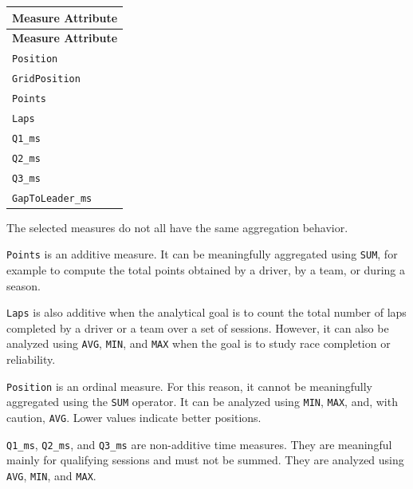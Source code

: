\documentclass[a4paper,11pt]{article}
\begin{document}
	\begin{longtable}{|p{8cm}|}
		\hline
		\textbf{Measure Attribute} \\
		\hline
		\endfirsthead
		
		\hline
		\textbf{Measure Attribute} \\
		\hline
		\endhead
		
		\texttt{Position} \\
		\hline

		\texttt{GridPosition} \\
		\hline
		
		\texttt{Points} \\
		\hline
		
		\texttt{Laps} \\
		\hline
		
		\texttt{Q1\_ms} \\
		\hline
		
		\texttt{Q2\_ms} \\
		\hline
		
		\texttt{Q3\_ms} \\
		\hline
		
		\texttt{GapToLeader\_ms} \\
		\hline
		
	\end{longtable}
	
	The selected measures do not all have the same aggregation behavior.
	
	\texttt{Points} is an additive measure. It can be meaningfully aggregated using
	\texttt{SUM}, for example to compute the total points obtained by a driver, by a team,
	or during a season.
	
	\texttt{Laps} is also additive when the analytical goal is to count the total number of
	laps completed by a driver or a team over a set of sessions. However, it can also be
	analyzed using \texttt{AVG}, \texttt{MIN}, and \texttt{MAX} when the goal is to study
	race completion or reliability.
	
	\texttt{Position} is an ordinal measure. For this reason, it cannot be meaningfully
	aggregated using the \texttt{SUM} operator. It can be analyzed using \texttt{MIN},
	\texttt{MAX}, and, with caution, \texttt{AVG}. Lower values indicate better positions.
	
	\texttt{Q1\_ms}, \texttt{Q2\_ms}, and \texttt{Q3\_ms} are non-additive time measures.
	They are meaningful mainly for qualifying sessions and must not be summed. They are
	analyzed using \texttt{AVG}, \texttt{MIN}, and \texttt{MAX}.
	
\end{document}

